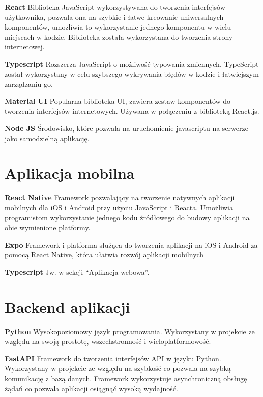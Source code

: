 \textbf{React} Biblioteka JavaScript wykorzystywana do tworzenia interfejsów użytkownika, pozwala ona na szybkie i łatwe kreowanie uniwersalnych komponentów, umożliwia to wykorzystanie jednego komponentu w wielu miejscach w kodzie. Biblioteka została wykorzystana do tworzenia strony internetowej.

\medskip

\textbf{Typescript} Rozszerza JavaScript o możliwość typowania zmiennych. TypeScript został wykorzystany w celu szybszego wykrywania błędów w kodzie i łatwiejszym zarządzaniu go.

\medskip

\textbf{Material UI} Popularna biblioteka UI, zawiera zestaw komponentów do tworzenia interfejsów internetowych. Używana w połączeniu z biblioteką React.js.

\medskip

\textbf{Node JS} Środowisko, które pozwala na uruchomienie javascriptu na serwerze jako samodzielną aplikację.

\section{Aplikacja mobilna}

\textbf{React Native} Framework pozwalający na tworzenie natywnych aplikacji mobilnych dla iOS i Android przy użyciu JavaScript i Reacta. Umożliwia programistom wykorzystanie jednego kodu źródłowego do budowy aplikacji na obie wymienione platformy.

\medskip

\textbf{Expo} Framework i platforma służąca do tworzenia aplikacji na iOS i Android za pomocą React Native, która ułatwia rozwój aplikacji mobilnych

\medskip

\textbf{Typescript} Jw. w sekcji “Aplikacja webowa”.

\section{Backend aplikacji}

\textbf{Python} Wysokopoziomowy język programowania. Wykorzystany w projekcie ze względu na swoją prostotę, wszechstronność i wieloplatformowość.

\medskip

\textbf{FastAPI} Framework do tworzenia interfejsów API w języku Python. Wykorzystany w projekcie ze względu na szybkość co pozwala na szybką komunikację z bazą danych. Framework wykorzystuje asynchroniczną obsługę żądań co pozwala aplikacji osiągnąć wysoką wydajność.

